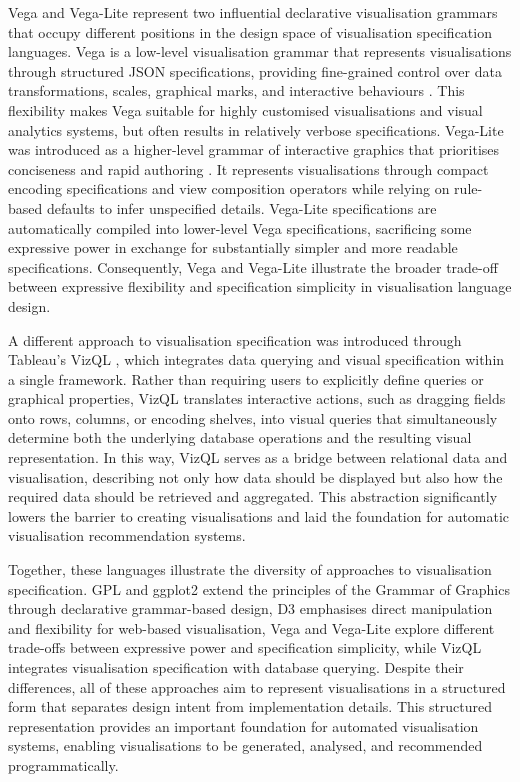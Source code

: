 Vega and Vega-Lite represent two influential declarative visualisation grammars that occupy different positions in the design space of visualisation specification languages. Vega is a low-level visualisation grammar that represents visualisations through structured JSON specifications, providing fine-grained control over data transformations, scales, graphical marks, and interactive behaviours \cite{vega2025}. This flexibility makes Vega suitable for highly customised visualisations and visual analytics systems, but often results in relatively verbose specifications. Vega-Lite was introduced as a higher-level grammar of interactive graphics that prioritises conciseness and rapid authoring \cite{satyanarayan2016vega}. It represents visualisations through compact encoding specifications and view composition operators while relying on rule-based defaults to infer unspecified details. Vega-Lite specifications are automatically compiled into lower-level Vega specifications, sacrificing some expressive power in exchange for substantially simpler and more readable specifications. Consequently, Vega and Vega-Lite illustrate the broader trade-off between expressive flexibility and specification simplicity in visualisation language design.

A different approach to visualisation specification was introduced through Tableau's VizQL \cite{mackinlay2007show}, which integrates data querying and visual specification within a single framework. Rather than requiring users to explicitly define queries or graphical properties, VizQL translates interactive actions, such as dragging fields onto rows, columns, or encoding shelves, into visual queries that simultaneously determine both the underlying database operations and the resulting visual representation. In this way, VizQL serves as a bridge between relational data and visualisation, describing not only how data should be displayed but also how the required data should be retrieved and aggregated. This abstraction significantly lowers the barrier to creating visualisations and laid the foundation for automatic visualisation recommendation systems.

Together, these languages illustrate the diversity of approaches to visualisation specification. GPL and ggplot2 extend the principles of the Grammar of Graphics through declarative grammar-based design, D3 emphasises direct manipulation and flexibility for web-based visualisation, Vega and Vega-Lite explore different trade-offs between expressive power and specification simplicity, while VizQL integrates visualisation specification with database querying. Despite their differences, all of these approaches aim to represent visualisations in a structured form that separates design intent from implementation details. This structured representation provides an important foundation for automated visualisation systems, enabling visualisations to be generated, analysed, and recommended programmatically.



